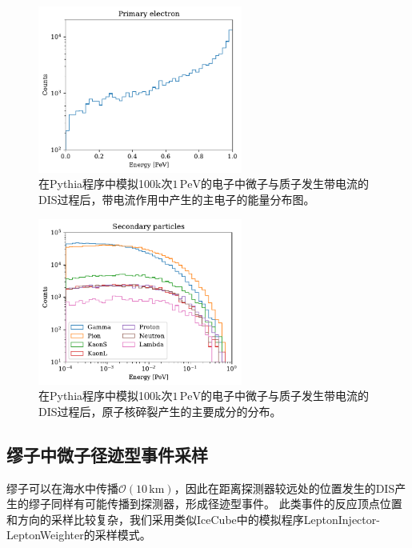 \begin{figure}[!ht]
\centering
    \includegraphics[width=0.60\textwidth]{img/DIS_primary_electron.pdf}
    \caption{在\textsf{Pythia}程序中模拟100k次$1\,\mathrm{PeV}$的电子中微子与质子发生带电流的DIS过程后，带电流作用中产生的主电子的能量分布图。}
    \label{fig:DIS_product_energy_dist_primary}
\end{figure}

\begin{figure}[!ht]
\centering
    \includegraphics[width=0.60\textwidth]{img/DIS_secondary_particles.pdf}
    \caption{在\textsf{Pythia}程序中模拟100k次$1\,\mathrm{PeV}$的电子中微子与质子发生带电流的DIS过程后，原子核碎裂产生的主要成分的分布。}
    \label{fig:DIS_product_energy_dist_secondary}
\end{figure}


\subsection{缪子中微子径迹型事件采样}
\label{subsec:muon_sampling}

缪子可以在海水中传播$\mathcal{O}(10\,\mathrm{km})$，因此在距离探测器较远处的位置发生的DIS产生的缪子同样有可能传播到探测器，形成径迹型事件。
此类事件的反应顶点位置和方向的采样比较复杂，我们采用类似IceCube中的模拟程序\textsf{LeptonInjector-LeptonWeighter}\cite{LeptonInjector:2020}的采样模式。

